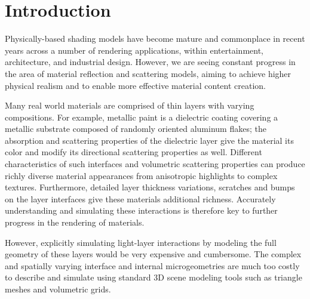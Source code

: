\section{Introduction}
\label{sec:intro}

Physically-based shading models have become mature and commonplace in recent years across a number of rendering applications, within entertainment, architecture, and industrial design. However, we are seeing constant progress in the area of material reflection and scattering models, aiming to achieve higher physical realism and to enable more effective material content creation.

%
Many real world materials are comprised of thin layers with varying compositions. For example, metallic paint is a dielectric coating covering a metallic substrate composed of randomly oriented aluminum flakes; the absorption and scattering properties of the dielectric layer give the material its color and modify its directional scattering properties as well.
Different characteristics of such interfaces and volumetric scattering properties can produce richly diverse material appearances from anisotropic highlights to complex textures. Furthermore, detailed layer thickness variations, scratches and bumps on the layer interfaces give these materials additional richness. Accurately understanding and simulating these interactions is therefore key to further progress in the rendering of materials.

%
However, explicitly simulating light-layer interactions by modeling the full geometry of these layers would be very expensive and cumbersome.
The complex and spatially varying interface and internal microgeometries are much too costly to describe and simulate using standard 3D scene modeling tools such as triangle meshes and volumetric grids.

